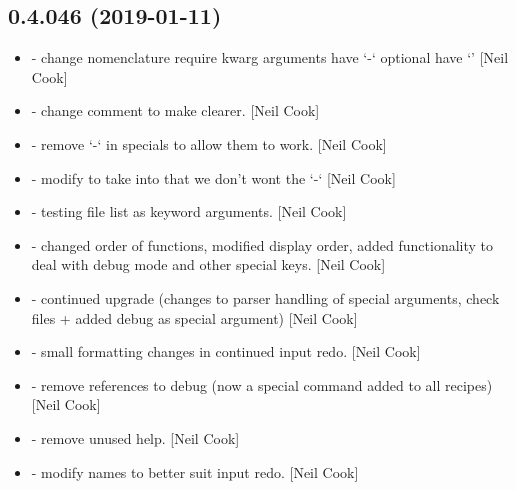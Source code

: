 \documentclass[a4paper,10pt,english]{report}
\begin{document}
\subsection{0.4.046 (2019-01-11)}
\label{\detokenize{misc/changelog:id218}}\begin{itemize}
\item {} 
 - change nomenclature require kwarg arguments have
‘-‘ optional have ‘\textendash{}’ {[}Neil Cook{]}

\item {} 
 - change comment to make clearer. {[}Neil Cook{]}

\item {} 
 - remove ‘-‘ in specials to allow them to work.
{[}Neil Cook{]}

\item {} 
 - modify  to take into that we don’t wont
the ‘-‘ {[}Neil Cook{]}

\item {} 
 - testing file list as keyword arguments. {[}Neil
Cook{]}

\item {} 
 - changed order of functions, modified display
order, added functionality to deal with debug mode and other special
keys. {[}Neil Cook{]}

\item {} 
 - continued upgrade (changes to parser handling of
special arguments, check files + added debug as special argument)
{[}Neil Cook{]}

\item {} 
 - small formatting changes in continued input redo.
{[}Neil Cook{]}

\item {} 
 - remove references to debug (now a special command
added to all recipes) {[}Neil Cook{]}

\item {} 
 - remove unused help. {[}Neil Cook{]}

\item {} 
 - modify names to better suit input redo. {[}Neil Cook{]}

\end{itemize}
\end{document}
